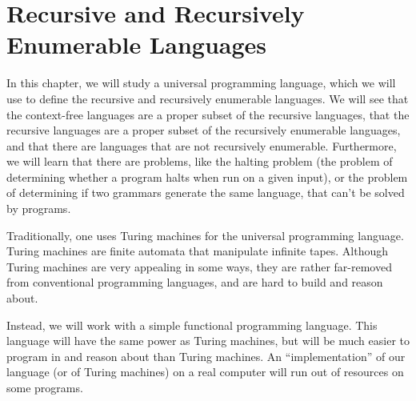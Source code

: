 \chapter{Recursive and Recursively Enumerable
Languages}
\label{RecursiveAndRecursivelyEnumerableLanguages}

In this chapter, we will study a universal programming language, which
we will use to define the recursive and recursively enumerable
languages.  We will see that the context-free languages are a proper
subset of the recursive languages, that the recursive languages are a
proper subset of the recursively enumerable languages, and that there
are languages that are not recursively enumerable.  Furthermore, we
will learn that there are problems, like the halting problem (the
problem of determining whether a program halts when run on a given
input), or the problem of determining if two grammars generate the
same language, that can't be solved by programs.

Traditionally, one uses Turing machines for the universal programming
language.  Turing machines are finite automata that manipulate
infinite tapes.  Although Turing machines are very appealing in some
ways, they are rather far-removed from conventional programming
languages, and are hard to build and reason about.

Instead, we will work with a simple functional programming language.
This language will have the same power as Turing machines, but will be
much easier to program in and reason about than Turing machines.
An ``implementation'' of our language (or of Turing machines) on a
real computer will run out of resources on some programs.





